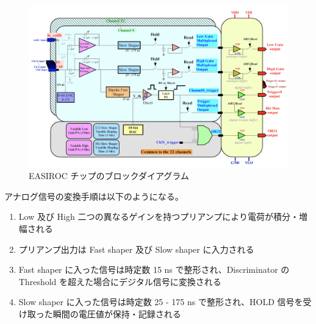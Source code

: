 \begin{figure}[H]
\begin{center}
\includegraphics[width = 13.0cm, bb= 0 0 1167 735]{5.png}
\end{center}
\caption{EASIROC チップのブロックダイアグラム}
\label{fig:}
\end{figure}

アナログ信号の変換手順は以下のようになる。
\begin{enumerate}
\item Low 及び High 二つの異なるゲインを持つプリアンプにより電荷が積分・増幅される
\item プリアンプ出力は Fast shaper 及び Slow shaper に入力される
\item Fast shaper に入った信号は時定数 15 ns で整形され、Discriminator の Threshold を超えた場合にデジタル信号に変換される
\item Slow shaper に入った信号は時定数 25 - 175 ns で整形され、HOLD 信号を受け取った瞬間の電圧値が保持・記録される
\end{enumerate}

